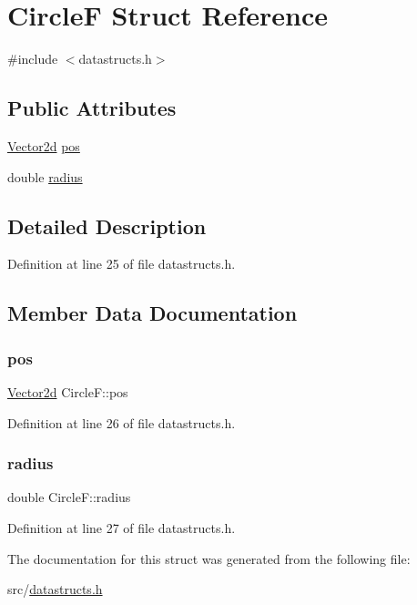 \hypertarget{struct_circle_f}{}\section{CircleF Struct Reference}
\label{struct_circle_f}


{\ttfamily \#include $<$datastructs.\+h$>$}

\subsection*{Public Attributes}
\begin{DoxyCompactItemize}
\item 
\mbox{\hyperlink{struct_vector2d}{Vector2d}} \mbox{\hyperlink{struct_circle_f_a70a1a092202e106be713f040d2662c41}{pos}}
\item 
double \mbox{\hyperlink{struct_circle_f_a8a8d764500441605ac98c12d53e71ac8}{radius}}
\end{DoxyCompactItemize}


\subsection{Detailed Description}


Definition at line 25 of file datastructs.\+h.



\subsection{Member Data Documentation}
\mbox{\label{struct_circle_f_a70a1a092202e106be713f040d2662c41}} 
\subsubsection{\texorpdfstring{pos}{pos}}
{\footnotesize\ttfamily \mbox{\hyperlink{struct_vector2d}{Vector2d}} Circle\+F\+::pos}



Definition at line 26 of file datastructs.\+h.

\mbox{\label{struct_circle_f_a8a8d764500441605ac98c12d53e71ac8}} 
\subsubsection{\texorpdfstring{radius}{radius}}
{\footnotesize\ttfamily double Circle\+F\+::radius}



Definition at line 27 of file datastructs.\+h.



The documentation for this struct was generated from the following file\+:\begin{DoxyCompactItemize}
\item 
src/\mbox{\hyperlink{datastructs_8h}{datastructs.\+h}}\end{DoxyCompactItemize}
